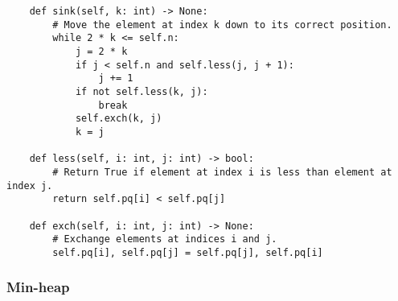 \documentclass{article}
\begin{document}
\begin{verbatim}
    def sink(self, k: int) -> None:
        # Move the element at index k down to its correct position.
        while 2 * k <= self.n:
            j = 2 * k
            if j < self.n and self.less(j, j + 1):
                j += 1
            if not self.less(k, j):
                break
            self.exch(k, j)
            k = j

    def less(self, i: int, j: int) -> bool:
        # Return True if element at index i is less than element at index j.
        return self.pq[i] < self.pq[j]

    def exch(self, i: int, j: int) -> None:
        # Exchange elements at indices i and j.
        self.pq[i], self.pq[j] = self.pq[j], self.pq[i]
\end{verbatim}

\subsubsection{Min-heap}
\end{document}
